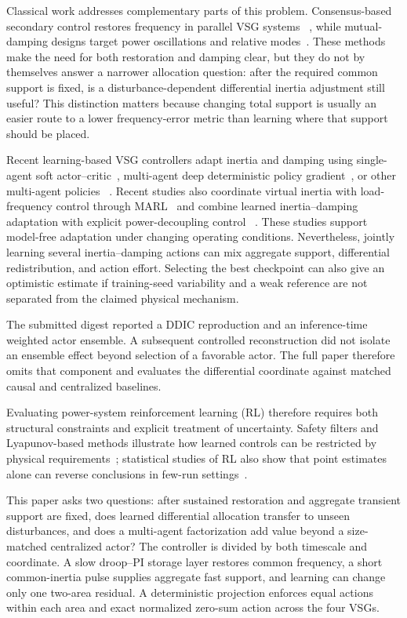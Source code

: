 \documentclass[conference,a4paper]{IEEEtran}
\begin{document}
Classical work addresses complementary parts of this problem. Consensus-based
secondary control restores frequency in parallel VSG systems
~\cite{liu2020consensus,shi2021restoration}, while mutual-damping designs target
power oscillations and relative modes~\cite{fu2022mutual,gao2024mutual}. These
methods make the need for both restoration and damping clear, but they do not
by themselves answer a narrower allocation question: after the required
common support is fixed, is a disturbance-dependent differential inertia
adjustment still useful? This distinction matters because changing total
support is usually an easier route to a lower frequency-error metric than
learning where that support should be placed.

Recent learning-based VSG controllers adapt inertia and damping using
single-agent soft actor--critic~\cite{lu2024sac}, multi-agent deep deterministic
policy gradient~\cite{zhang2024maddpg}, or other multi-agent policies
~\cite{yang2023ddic,kang2025madrl}. Recent studies also coordinate virtual
inertia with load-frequency control through MARL~\cite{ali2026fuzzy} and combine
learned inertia--damping adaptation with explicit power-decoupling control
~\cite{peng2026cooperative}. These studies support model-free adaptation
under changing operating conditions. Nevertheless, jointly learning several
inertia--damping actions can mix aggregate support, differential
redistribution, and action effort. Selecting the best checkpoint can also give
an optimistic estimate if training-seed variability and a weak reference are
not separated from the claimed physical mechanism.

The submitted digest reported a DDIC reproduction and an inference-time
weighted actor ensemble. A subsequent controlled reconstruction did not isolate
an ensemble effect beyond selection of a favorable actor. The full paper
therefore omits that component and evaluates the differential coordinate
against matched causal and centralized baselines.

Evaluating power-system reinforcement learning (RL) therefore requires both
structural constraints and explicit treatment of uncertainty. Safety filters
and Lyapunov-based methods illustrate how learned controls can be restricted by
physical requirements~\cite{tabas2022safe,shuai2025safe}; statistical studies
of RL also show that point estimates alone can reverse conclusions in few-run
settings~\cite{agarwal2021statistical}.

This paper asks two questions: after sustained restoration
and aggregate transient support are fixed, does learned differential allocation
transfer to unseen disturbances, and does a multi-agent factorization add value
beyond a size-matched centralized actor? The controller is divided by both
timescale and coordinate. A slow droop--PI storage layer restores common
frequency, a short common-inertia pulse supplies aggregate fast support, and
learning can change only one two-area residual. A deterministic projection
enforces equal actions within each area and exact normalized zero-sum action
across the four VSGs.
\end{document}
